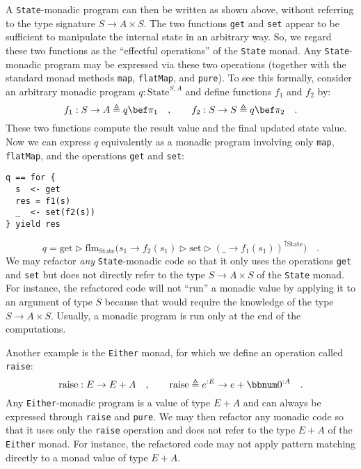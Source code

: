 A \lstinline!State!-monadic program can then be written as shown
above, without referring to the type signature $S\rightarrow A\times S$.
The two functions \lstinline!get! and \lstinline!set! appear to
be sufficient to manipulate the internal state in an arbitrary way.
So, we regard these two functions as the \textsf{``}effectful operations\textsf{''}
of the \lstinline!State! monad. Any \lstinline!State!-monadic program
may be expressed via these two operations (together with the standard
monad methods \lstinline!map!, \lstinline!flatMap!, and \lstinline!pure!).
To see this formally, consider an arbitrary monadic program $q:\text{State}^{S,A}$
and define functions $f_{1}$ and $f_{2}$ by:
\[
f_{1}:S\rightarrow A\triangleq q\bef\pi_{1}\quad,\quad\quad f_{2}:S\rightarrow S\triangleq q\bef\pi_{2}\quad.
\]
These two functions compute the result value and the final updated
state value. Now we can express $q$ equivalently as a monadic program
involving only \lstinline!map!, \lstinline!flatMap!, and the operations
\lstinline!get! and \lstinline!set!:

\begin{lstlisting}
q == for {
  s  <- get
  res = f1(s)
  _  <- set(f2(s))
} yield res
\end{lstlisting}
\[
q=\text{get}\triangleright\text{flm}_{\text{State}}\big(s_{1}\rightarrow f_{2}(s_{1})\triangleright\text{set}\triangleright(\_\rightarrow f_{1}(s_{1}))^{\uparrow\text{State}}\big)\quad.
\]
We may refactor \emph{any} \lstinline!State!-monadic code so that
it only uses the operations \lstinline!get! and \lstinline!set!
but does not directly refer to the type $S\rightarrow A\times S$
of the \lstinline!State! monad. For instance, the refactored code
will not \textsf{``}run\textsf{''} a monadic value by applying it to an argument of
type $S$ because that would require the knowledge of the type $S\rightarrow A\times S$.
Usually, a monadic program is run only at the end of the computations.

Another example is the \lstinline!Either! monad, for which we define
an operation called \lstinline!raise!:
\[
\text{raise}:E\rightarrow E+A\quad,\quad\quad\text{raise}\triangleq e^{:E}\rightarrow e+\bbnum 0^{:A}\quad.
\]
Any \lstinline!Either!-monadic program is a value of type $E+A$
and can always be expressed through \lstinline!raise! and \lstinline!pure!.
We may then refactor any monadic code so that it uses only the \lstinline!raise!
operation and does not refer to the type $E+A$ of the \lstinline!Either!
monad. For instance, the refactored code may not apply pattern matching
directly to a monad value of type $E+A$.

